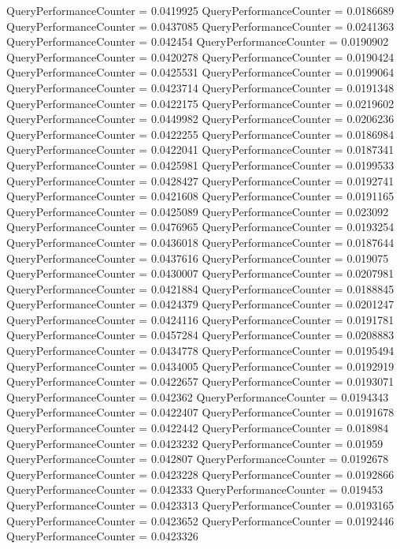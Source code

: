 \documentclass[9pt]{article}
\theoremstyle{plain}
\theoremstyle{definition}
\theoremstyle{remark}
\numberwithin{equation}{section}
\begin{document}
QueryPerformanceCounter  =  0.0419925
QueryPerformanceCounter  =  0.0186689
QueryPerformanceCounter  =  0.0437085
QueryPerformanceCounter  =  0.0241363
QueryPerformanceCounter  =  0.042454
QueryPerformanceCounter  =  0.0190902
QueryPerformanceCounter  =  0.0420278
QueryPerformanceCounter  =  0.0190424
QueryPerformanceCounter  =  0.0425531
QueryPerformanceCounter  =  0.0199064
QueryPerformanceCounter  =  0.0423714
QueryPerformanceCounter  =  0.0191348
QueryPerformanceCounter  =  0.0422175
QueryPerformanceCounter  =  0.0219602
QueryPerformanceCounter  =  0.0449982
QueryPerformanceCounter  =  0.0206236
QueryPerformanceCounter  =  0.0422255
QueryPerformanceCounter  =  0.0186984
QueryPerformanceCounter  =  0.0422041
QueryPerformanceCounter  =  0.0187341
QueryPerformanceCounter  =  0.0425981
QueryPerformanceCounter  =  0.0199533
QueryPerformanceCounter  =  0.0428427
QueryPerformanceCounter  =  0.0192741
QueryPerformanceCounter  =  0.0421608
QueryPerformanceCounter  =  0.0191165
QueryPerformanceCounter  =  0.0425089
QueryPerformanceCounter  =  0.023092
QueryPerformanceCounter  =  0.0476965
QueryPerformanceCounter  =  0.0193254
QueryPerformanceCounter  =  0.0436018
QueryPerformanceCounter  =  0.0187644
QueryPerformanceCounter  =  0.0437616
QueryPerformanceCounter  =  0.019075
QueryPerformanceCounter  =  0.0430007
QueryPerformanceCounter  =  0.0207981
QueryPerformanceCounter  =  0.0421884
QueryPerformanceCounter  =  0.0188845
QueryPerformanceCounter  =  0.0424379
QueryPerformanceCounter  =  0.0201247
QueryPerformanceCounter  =  0.0424116
QueryPerformanceCounter  =  0.0191781
QueryPerformanceCounter  =  0.0457284
QueryPerformanceCounter  =  0.0208883
QueryPerformanceCounter  =  0.0434778
QueryPerformanceCounter  =  0.0195494
QueryPerformanceCounter  =  0.0434005
QueryPerformanceCounter  =  0.0192919
QueryPerformanceCounter  =  0.0422657
QueryPerformanceCounter  =  0.0193071
QueryPerformanceCounter  =  0.042362
QueryPerformanceCounter  =  0.0194343
QueryPerformanceCounter  =  0.0422407
QueryPerformanceCounter  =  0.0191678
QueryPerformanceCounter  =  0.0422442
QueryPerformanceCounter  =  0.018984
QueryPerformanceCounter  =  0.0423232
QueryPerformanceCounter  =  0.01959
QueryPerformanceCounter  =  0.042807
QueryPerformanceCounter  =  0.0192678
QueryPerformanceCounter  =  0.0423228
QueryPerformanceCounter  =  0.0192866
QueryPerformanceCounter  =  0.042333
QueryPerformanceCounter  =  0.019453
QueryPerformanceCounter  =  0.0423313
QueryPerformanceCounter  =  0.0193165
QueryPerformanceCounter  =  0.0423652
QueryPerformanceCounter  =  0.0192446
QueryPerformanceCounter  =  0.0423326
\end{document}
